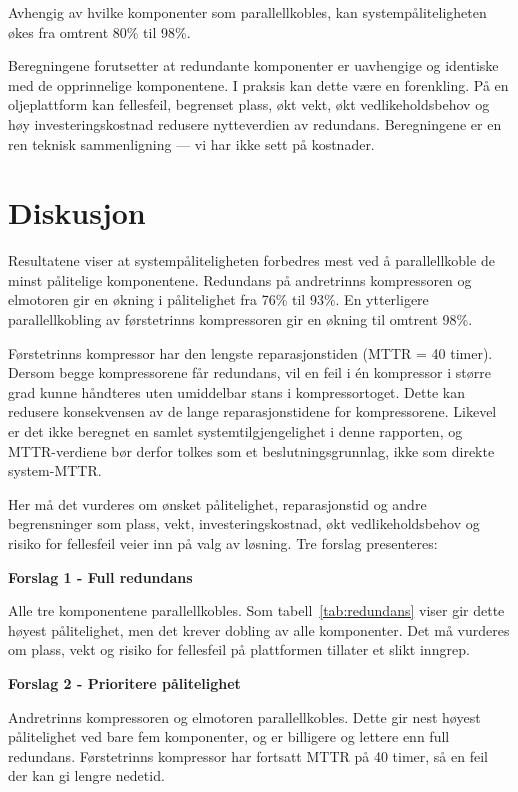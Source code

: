 Avhengig av hvilke komponenter som parallellkobles, kan systempåliteligheten økes fra omtrent 80\% til 98\%.

Beregningene forutsetter at redundante komponenter er uavhengige og identiske med de opprinnelige komponentene. I praksis kan dette være en forenkling. På en oljeplattform kan fellesfeil, begrenset plass, økt vekt, økt vedlikeholdsbehov og høy investeringskostnad redusere nytteverdien av redundans. Beregningene er en ren teknisk sammenligning — vi har ikke sett på kostnader.

\section{Diskusjon}

Resultatene viser at systempåliteligheten forbedres mest ved å parallellkoble de minst pålitelige komponentene. Redundans på andretrinns kompressoren og elmotoren gir en økning i pålitelighet fra 76\% til 93\%. En ytterligere parallellkobling av førstetrinns kompressoren gir en økning til omtrent 98\%.

Førstetrinns kompressor har den lengste reparasjonstiden (MTTR = 40 timer). Dersom begge kompressorene får redundans, vil en feil i én kompressor i større grad kunne håndteres uten umiddelbar stans i kompressortoget. Dette kan redusere konsekvensen av de lange reparasjonstidene for kompressorene. Likevel er det ikke beregnet en samlet systemtilgjengelighet i denne rapporten, og MTTR-verdiene bør derfor tolkes som et beslutningsgrunnlag, ikke som direkte system-MTTR.

Her må det vurderes om ønsket pålitelighet, reparasjonstid og andre begrensninger som plass, vekt, investeringskostnad, økt vedlikeholdsbehov og risiko for fellesfeil veier inn på valg av løsning. Tre forslag presenteres:

\textbf{\large Forslag 1 - Full redundans}

Alle tre komponentene parallellkobles. Som tabell~\ref{tab:redundans} viser gir dette høyest pålitelighet, men det krever dobling av alle komponenter. Det må vurderes om plass, vekt og risiko for fellesfeil på plattformen tillater et slikt inngrep.

\textbf{\large Forslag 2 - Prioritere pålitelighet}

Andretrinns kompressoren og elmotoren parallellkobles. Dette gir nest høyest pålitelighet ved bare fem komponenter, og er billigere og lettere enn full redundans. Førstetrinns kompressor har fortsatt MTTR på 40 timer, så en feil der kan gi lengre nedetid.

